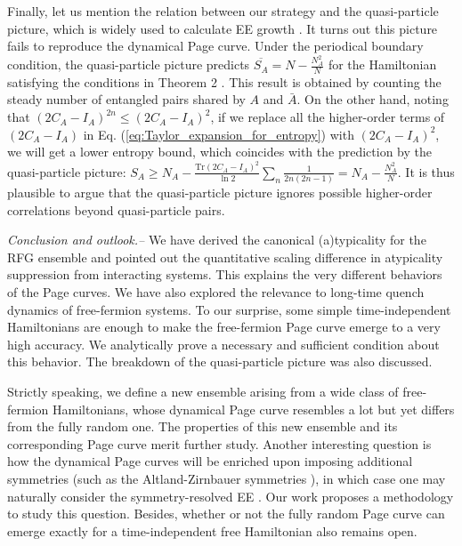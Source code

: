 \documentclass[twocolumn,english,prl,aps,superscriptaddress,amsmath,amssymb,floatfix]{revtex4-2}
\begin{document}
Finally, let us mention the relation between our strategy
and the quasi-particle picture, which is widely 
used to calculate EE 
growth \citep{PhysRevLett.127.060404,Jurcevic2014,Castro2016_,Essler2016,Calabrese2005,Fagotti2008,Bertini2018,BertiniB2018_2}. 
It turns out this picture fails to 
reproduce the 
dynamical Page curve. Under the 
periodical boundary condition, the quasi-particle
picture predicts 
$\overline{S_{A}}=N-\frac{N_{A}^{2}}{N}$
for the Hamiltonian satisfying the conditions in Theorem 2 \cite{SM}. This result is obtained by counting the steady number of entangled pairs shared by $A$ and $\bar A$. 
On the other hand, noting that $(2C_{A}-I_{A})^{2n}\leq(2C_{A}-I_{A})^{2}$,
if we replace all the higher-order terms of $(2C_{A}-I_{A})$ in Eq. (\ref{eq:Taylor_expansion_for_entropy})
with $(2C_{A}-I_{A})^{2}$, we will get a lower entropy 
bound, which coincides with the prediction 
by the quasi-particle picture: $S_{A}\geq N_{A}-\frac{\mathrm{Tr}(2C_{A}-I_{A})^{2}}{\ln2}\sum_{n}\frac{1}{2n(2n-1)}=N_{A}-\frac{N_{A}^{2}}{N}$.
It is thus plausible 
to argue that the quasi-particle picture ignores
possible higher-order correlations beyond 
quasi-particle pairs. 


\emph{Conclusion and outlook.--}
We have derived the canonical
(a)typicality for the RFG ensemble 
and pointed out the quantitative 
scaling difference in atypicality suppression 
from interacting systems. This 
explains the very different behaviors of the Page curves. 
We have also explored the relevance to long-time quench dynamics of 
free-fermion systems. 
To our surprise, some simple time-independent
Hamiltonians are enough to 
make the free-fermion Page curve 
emerge to a very high accuracy. 
We analytically prove a necessary and sufficient condition about this behavior. The breakdown 
of the quasi-particle picture was also discussed.

Strictly speaking, we define a new 
ensemble arising from 
a wide class of free-fermion Hamiltonians, whose dynamical Page curve resembles a lot but yet differs from 
the fully random one. 
The properties of this new ensemble and its corresponding Page curve 
merit further study. Another interesting question is how the 
dynamical Page curves will be enriched upon imposing 
additional symmetries (such as the Altland-Zirnbauer symmetries \cite{Altland1997}), in which case one may naturally consider the symmetry-resolved EE 
\citep{PhysRevD.106.046015,Lau2022}. 
Our work proposes a methodology to study this question. Besides, whether
or not the fully random Page curve can emerge exactly for a time-independent free Hamiltonian 
also remains open.
\end{document}
